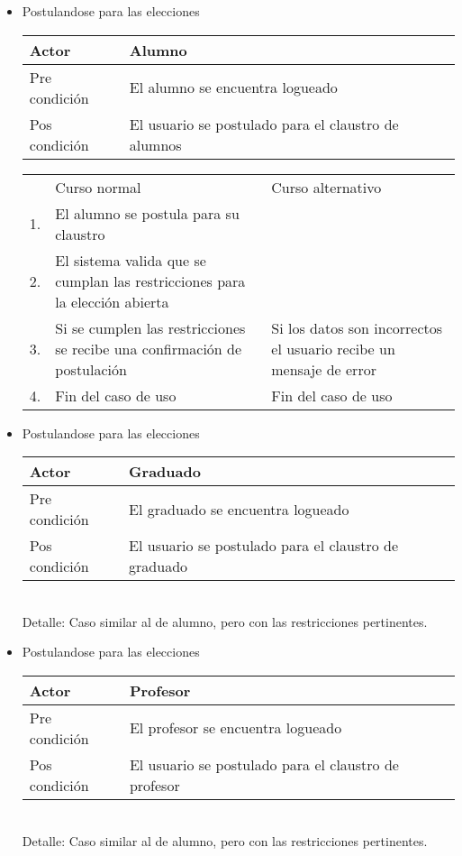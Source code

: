 \begin{itemize}
\bigskip
\item Postulandose para las elecciones
\bigskip
\begin{center}
\begin{tabular}{ll}
Actor & Alumno \\
\hline
Pre condición & El alumno se encuentra logueado \\
\hline
Pos condición & El usuario se postulado para el claustro de alumnos\\
\hline
\end{tabular}
\medskip
\begin{tabular}{c p{4cm}|p{4cm}}
 & Curso normal & Curso alternativo \\
 1. & El alumno se postula para su claustro &  \\
 2. & El sistema valida que se cumplan las restricciones para la elección abierta & \\
 3. & Si se cumplen las restricciones se recibe una confirmación de postulación & Si los datos son incorrectos el usuario recibe un mensaje de error\\
 4. & Fin del caso de uso & Fin del caso de uso \\
\end{tabular}
\end{center}

\bigskip
\item Postulandose para las elecciones
\bigskip
\begin{center}
\begin{tabular}{ll}
Actor & Graduado \\
\hline
Pre condición & El graduado se encuentra logueado \\
\hline
Pos condición & El usuario se postulado para el claustro de graduado\\
\hline
\end{tabular}
\medskip
\\
Detalle: Caso similar al de alumno, pero con las restricciones pertinentes.
\end{center}

\bigskip
\item Postulandose para las elecciones
\bigskip
\begin{center}
\begin{tabular}{ll}
Actor & Profesor \\
\hline
Pre condición & El profesor se encuentra logueado \\
\hline
Pos condición & El usuario se postulado para el claustro de profesor\\
\hline
\end{tabular}
\medskip
\\
Detalle: Caso similar al de alumno, pero con las restricciones pertinentes.
\end{center}



\end{itemize}
